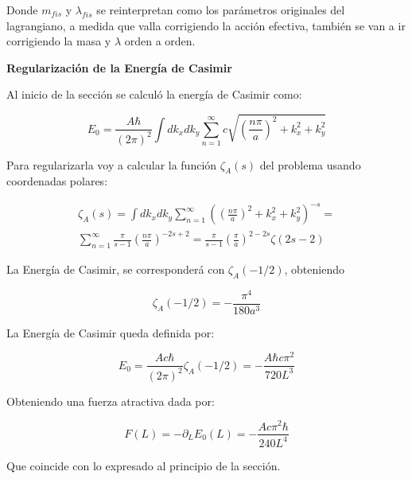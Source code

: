 Donde $m _{fis}$ y $ \lambda _{fis} $ se reinterpretan como los parámetros originales del lagrangiano, a medida que valla corrigiendo la acción efectiva, también se van a ir corrigiendo la masa y $\lambda $ orden a orden.

\textbf{Regularización de la Energía de Casimir}

Al inicio de la sección se calculó la energía de Casimir como:

\begin{equation}
E _0 = \frac{A \hbar }{(2 \pi) ^2} \int dk _x dk _y 
\sum _{n=1} ^{\infty} 
c
\sqrt{
		\left( \frac{n \pi}{a } \right) ^2 + k _x ^2 + k _y ^2
		}
\end{equation}

Para regularizarla voy a calcular la función $\zeta _A (s)$ del problema usando coordenadas polares:

\begin{equation}
\begin{array}{c}

\zeta _A (s) = 
\int dk _x dk _y 
\sum _{n=1} ^{\infty} 
\left(	\left( \frac{n \pi}{a } \right) ^2 + k _x ^2 + k _y ^2
		\right) ^{-s} = \\
\sum _{n=1} ^{\infty}  \frac{\pi}{s-1} \left( \frac{n \pi}{a} \right) ^{-2s+2} =
\frac{\pi}{s-1} \left( \frac{\pi}{a} \right) ^{2-2s} \zeta (2s-2) 

\end{array}
\end{equation}

La Energía de Casimir, se corresponderá con $\zeta _A (-1/2)$, obteniendo 


\begin{equation}
\zeta _A (-1/2) = 
- \frac{\pi ^4}{180 a ^3}
\end{equation}

La Energía de Casimir queda definida por:

\begin{equation}
E _0 =  \frac{A c \hbar}{(2 \pi) ^2}
\zeta _A (-1/2) =
- \frac{A \hbar c \pi ^2}
		{720 L ^3}
\end{equation}

Obteniendo una fuerza atractiva dada por:

\begin{equation}
F(L) = - \partial _L E _0 (L) = 
- \frac{A c \pi ^2 \hbar}{240 L^4}
\end{equation}

Que coincide con lo expresado al principio de la sección. \\ \\


